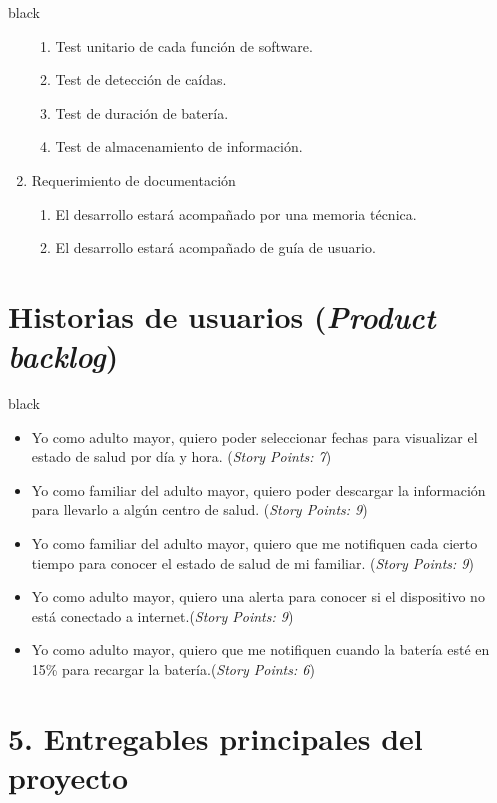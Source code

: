 \documentclass[11pt]{charter}
\begin{document}
\begin{consigna}{black}
\begin{enumerate}
	\begin{enumerate}
	\item Test unitario de cada función de software.
	\item Test de detección de caídas.
	\item Test de duración de batería.
	\item Test de almacenamiento de información.
	\end{enumerate}
\item Requerimiento de documentación
	\begin{enumerate}
	\item El desarrollo estará acompañado por una memoria técnica.
	\item El desarrollo estará acompañado de guía de usuario.
	\end{enumerate}

\end{enumerate}
\end{consigna}

\section{Historias de usuarios (\textit{Product backlog})}
\label{sec:backlog}

\begin{consigna}{black}
\vspace{-35px}
\begin{itemize}
\item Yo como adulto mayor, quiero poder seleccionar fechas para visualizar el estado de salud por día y hora. (\textit{Story Points: 7})
\item Yo como familiar del adulto mayor, quiero poder descargar la información para llevarlo a algún centro de salud. (\textit{Story Points: 9}) 
\item Yo como familiar del adulto mayor, quiero que me notifiquen cada cierto tiempo para conocer el estado de salud de mi familiar. (\textit{Story Points: 9}) 
\item Yo como adulto mayor, quiero una alerta para conocer si el dispositivo no está conectado a internet.(\textit{Story Points: 9})  
\item Yo como adulto mayor, quiero que me notifiquen cuando la batería esté en 15\% para recargar la batería.(\textit{Story Points: 6}) 
\end{itemize}
\end{consigna}

\section{5. Entregables principales del proyecto}
\label{sec:entregables}
\end{document}
